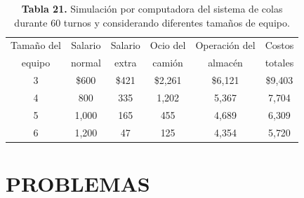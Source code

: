 \documentclass[11pt,letterpaper]{report}
\begin{document}
\begin{table}[H]
\centering
\caption*{\textbf{Tabla 21.} Simulación por computadora del sistema de colas durante 60 turnos y considerando diferentes tamaños de equipo.}
\begin{tabular}{cccccc}
\toprule
Tamaño del & Salario & Salario & Ocio del & Operación del & Costos \\
equipo & normal & extra & camión & almacén & totales \\
\midrule
3 & \$600   & \$421 & \$2{,}261 & \$6{,}121 & \$9{,}403 \\
4 & 800     & 335   & 1{,}202   & 5{,}367   & 7{,}704 \\
5 & 1{,}000 & 165   & 455       & 4{,}689   & 6{,}309 \\
6 & 1{,}200 & 47    & 125       & 4{,}354   & 5{,}720 \\
\bottomrule
\end{tabular}
\end{table}

\section*{PROBLEMAS}
\end{document}
